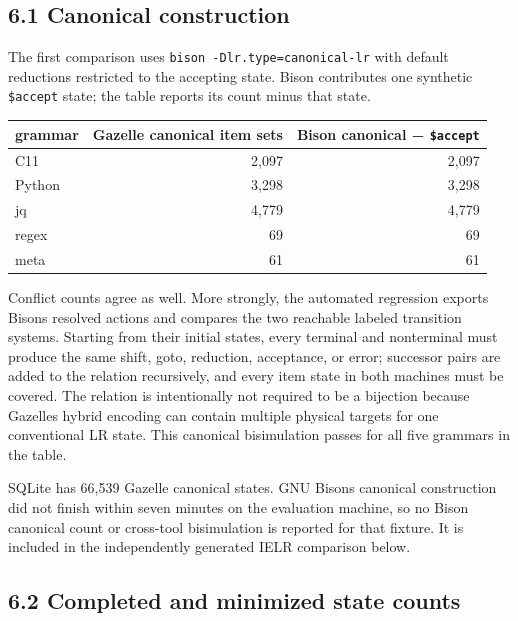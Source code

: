 \documentclass[
  10pt,
]{article}
\begin{document}
\hypertarget{61-canonical-construction}{%
\subsection{6.1 Canonical
construction}\label{61-canonical-construction}}

The first comparison uses \texttt{bison\ -Dlr.type=canonical-lr} with
default reductions restricted to the accepting state. Bison contributes
one synthetic \texttt{\$accept} state; the table reports its count minus
that state.

\begin{longtable}[]{@{}lrr@{}}
\toprule\noalign{}
grammar & Gazelle canonical item sets & Bison canonical −
\texttt{\$accept} \\
\midrule\noalign{}
\endhead
\bottomrule\noalign{}
\endlastfoot
C11 & 2,097 & 2,097 \\
Python & 3,298 & 3,298 \\
jq & 4,779 & 4,779 \\
regex & 69 & 69 \\
meta & 61 & 61 \\
\end{longtable}

Conflict counts agree as well. More strongly, the automated regression
exports Bison\textquotesingle s resolved actions and compares the two
reachable labeled transition systems. Starting from their initial
states, every terminal and nonterminal must produce the same shift,
goto, reduction, acceptance, or error; successor pairs are added to the
relation recursively, and every item state in both machines must be
covered. The relation is intentionally not required to be a bijection
because Gazelle\textquotesingle s hybrid encoding can contain multiple
physical targets for one conventional LR state. This canonical
bisimulation passes for all five grammars in the table.

SQLite has 66,539 Gazelle canonical states. GNU Bison\textquotesingle s
canonical construction did not finish within seven minutes on the
evaluation machine, so no Bison canonical count or cross-tool
bisimulation is reported for that fixture. It is included in the
independently generated IELR comparison below.

\hypertarget{62-completed-and-minimized-state-counts}{%
\subsection{6.2 Completed and minimized state
counts}\label{62-completed-and-minimized-state-counts}}
\end{document}
